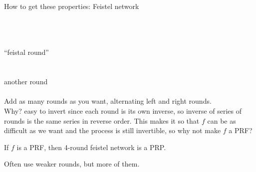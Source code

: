 How to get these properties: Feistel network

\\
\\
\makebox[6cm]{\makebox[1cm]{$\downarrow$}\makebox[4cm]{}\makebox[1cm]{$\downarrow$}}\\
   ``feistal round''\\
\makebox[6cm]{\makebox[1cm]{$\downarrow$}\makebox[4cm]{}\makebox[1cm]{$\downarrow$}}\\
\makebox[6cm]{------------------------------------------------}\\
   another round\\
\makebox[6cm]{\makebox[1cm]{$\downarrow$}\makebox[4cm]{}\makebox[1cm]{$\downarrow$}}\\

Add as many rounds as you want, alternating left and right rounds.\\

Why? easy to invert since each round is its own inverse, so inverse of series
of rounds is the same series in reverse order. This makes it so that $f$ can be
as difficult as we want and the process is still invertible, so why not make $f$
a PRF?\\

\begin{theorem*}
If $f$ is a PRF, then 4-round feistel network is a PRP.
\end{theorem*}
Often use weaker rounds, but more of them.

